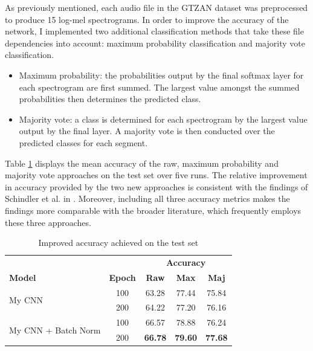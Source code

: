 \documentclass[conference]{IEEEtran}
\begin{document}
As previously mentioned, each audio file in the GTZAN \cite{TzanetakisCook} dataset was preprocessed to produce 15 log-mel spectrograms.
In order to improve the accuracy of the network, I implemented two additional classification methods that take these file dependencies into account: maximum probability classification and majority vote classification.
\begin{itemize}
    \item Maximum probability: the probabilities output by the final softmax layer for each spectrogram are first summed. The largest value amongst the summed probabilities then determines the predicted class.
    \item Majority vote: a class is determined for each spectrogram by the largest value output by the final layer. A majority vote is then conducted over the predicted classes for each segment.
\end{itemize}

Table \ref{improved_results} displays the mean accuracy of the raw, maximum probability and majority vote approaches on the test set over five runs.
The relative improvement in accuracy provided by the two new approaches is consistent with the findings of Schindler et al. in \cite{SchindlerLidyRauber}.
Moreover, including all three accuracy metrics makes the findings more comparable with the broader literature, which frequently employs these three approaches.

\begin{table}[htbp]
    \caption{Improved accuracy achieved on the test set}
    \begin{center}
    \begin{tabular}{l c c c c}
    \toprule
    &&\multicolumn{3}{c}{\textbf{Accuracy}}\\
    \cmidrule(lr){3-5}
    \textbf{Model}&\textbf{Epoch}&\textbf{Raw}&\textbf{Max}&\textbf{Maj}\\
    \midrule
    \multirow{ 2}{*}{My CNN} & 100 & 63.28 & 77.44 & 75.84 \\
    & 200 & 64.22 & 77.20 & 76.16 \\
    \midrule
    \multirow{ 2}{*}{My CNN + Batch Norm} & 100 & 66.57 & 78.88 & 76.24 \\
    & 200 & \textbf{66.78} & \textbf{79.60} & \textbf{77.68} \\
    \bottomrule
    \end{tabular}
    \label{improved_results}
    \end{center}
\end{table}
\end{document}
